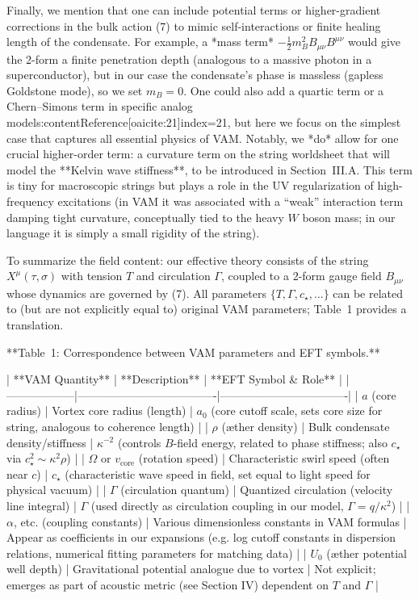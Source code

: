 \documentclass[12pt]{article}
\begin{document}
Finally, we mention that one can include potential terms or higher-gradient corrections in the bulk action (7) to mimic self-interactions or finite healing length of the condensate. For example, a *mass term* $-\frac{1}{2} m_B^2 B_{\mu\nu}B^{\mu\nu}$ would give the 2-form a finite penetration depth (analogous to a massive photon in a superconductor), but in our case the condensate’s phase is massless (gapless Goldstone mode), so we set $m_B=0$. One could also add a quartic term or a Chern–Simons term in specific analog models:contentReference[oaicite:21]{index=21}, but here we focus on the simplest case that captures all essential physics of VAM. Notably, we *do* allow for one crucial higher-order term: a curvature term on the string worldsheet that will model the **Kelvin wave stiffness**, to be introduced in Section III.A. This term is tiny for macroscopic strings but plays a role in the UV regularization of high-frequency excitations (in VAM it was associated with a “weak” interaction term damping tight curvature, conceptually tied to the heavy $W$ boson mass; in our language it is simply a small rigidity of the string).

To summarize the field content: our effective theory consists of the string $X^\mu(\tau,\sigma)$ with tension $T$ and circulation $\Gamma$, coupled to a 2-form gauge field $B_{\mu\nu}$ whose dynamics are governed by (7). All parameters $\{T,\Gamma,c_\star,\ldots\}$ can be related to (but are not explicitly equal to) original VAM parameters; Table 1 provides a translation. 

**Table 1: Correspondence between VAM parameters and EFT symbols.**

| **VAM Quantity** | **Description**                     | **EFT Symbol & Role**            |
|------------------|-------------------------------------|----------------------------------|
| $a$ (core radius)           | Vortex core radius (length)     | $a_0$ (core cutoff scale, sets core size for string, analogous to coherence length) |
| $\rho$ (æther density)      | Bulk condensate density/stiffness | $\kappa^{-2}$ (controls $B$-field energy, related to phase stiffness; also $c_\star$ via $c_\star^2 \sim \kappa^2 \rho$) |
| $\Omega$ or $v_{\text{core}}$ (rotation speed) | Characteristic swirl speed (often near $c$) | $c_\star$ (characteristic wave speed in field, set equal to light speed for physical vacuum) |
| $\Gamma$ (circulation quantum) | Quantized circulation (velocity line integral) | $\Gamma$ (used directly as circulation coupling in our model, $\Gamma = q/\kappa^2$) |
| $\alpha$, etc. (coupling constants) | Various dimensionless constants in VAM formulas | Appear as coefficients in our expansions (e.g. log cutoff constants in dispersion relations, numerical fitting parameters for matching data) |
| $U_0$ (æther potential well depth) | Gravitational potential analogue due to vortex | Not explicit; emerges as part of acoustic metric (see Section IV) dependent on $T$ and $\Gamma$ |
\end{document}
